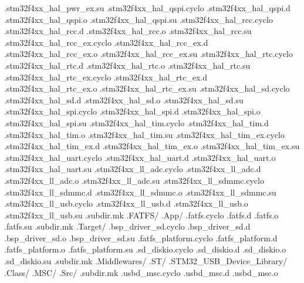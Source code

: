 \documentclass{article}
\begin{document}
{            .stm32f4xx_hal_pwr_ex.su
            .stm32f4xx_hal_qspi.cyclo
            .stm32f4xx_hal_qspi.d
            .stm32f4xx_hal_qspi.o
            .stm32f4xx_hal_qspi.su
            .stm32f4xx_hal_rcc.cyclo
            .stm32f4xx_hal_rcc.d
            .stm32f4xx_hal_rcc.o
            .stm32f4xx_hal_rcc.su
            .stm32f4xx_hal_rcc_ex.cyclo
            .stm32f4xx_hal_rcc_ex.d
            .stm32f4xx_hal_rcc_ex.o
            .stm32f4xx_hal_rcc_ex.su
            .stm32f4xx_hal_rtc.cyclo
            .stm32f4xx_hal_rtc.d
            .stm32f4xx_hal_rtc.o
            .stm32f4xx_hal_rtc.su
            .stm32f4xx_hal_rtc_ex.cyclo
            .stm32f4xx_hal_rtc_ex.d
            .stm32f4xx_hal_rtc_ex.o
            .stm32f4xx_hal_rtc_ex.su
            .stm32f4xx_hal_sd.cyclo
            .stm32f4xx_hal_sd.d
            .stm32f4xx_hal_sd.o
            .stm32f4xx_hal_sd.su
            .stm32f4xx_hal_spi.cyclo
            .stm32f4xx_hal_spi.d
            .stm32f4xx_hal_spi.o
            .stm32f4xx_hal_spi.su
            .stm32f4xx_hal_tim.cyclo
            .stm32f4xx_hal_tim.d
            .stm32f4xx_hal_tim.o
            .stm32f4xx_hal_tim.su
            .stm32f4xx_hal_tim_ex.cyclo
            .stm32f4xx_hal_tim_ex.d
            .stm32f4xx_hal_tim_ex.o
            .stm32f4xx_hal_tim_ex.su
            .stm32f4xx_hal_uart.cyclo
            .stm32f4xx_hal_uart.d
            .stm32f4xx_hal_uart.o
            .stm32f4xx_hal_uart.su
            .stm32f4xx_ll_adc.cyclo
            .stm32f4xx_ll_adc.d
            .stm32f4xx_ll_adc.o
            .stm32f4xx_ll_adc.su
            .stm32f4xx_ll_sdmmc.cyclo
            .stm32f4xx_ll_sdmmc.d
            .stm32f4xx_ll_sdmmc.o
            .stm32f4xx_ll_sdmmc.su
            .stm32f4xx_ll_usb.cyclo
            .stm32f4xx_ll_usb.d
            .stm32f4xx_ll_usb.o
            .stm32f4xx_ll_usb.su
            .subdir.mk
      .FATFS/
        .App/
          .fatfs.cyclo
          .fatfs.d
          .fatfs.o
          .fatfs.su
          .subdir.mk
        .Target/
          .bsp_driver_sd.cyclo
          .bsp_driver_sd.d
          .bsp_driver_sd.o
          .bsp_driver_sd.su
          .fatfs_platform.cyclo
          .fatfs_platform.d
          .fatfs_platform.o
          .fatfs_platform.su
          .sd_diskio.cyclo
          .sd_diskio.d
          .sd_diskio.o
          .sd_diskio.su
          .subdir.mk
      .Middlewares/
        .ST/
          .STM32_USB_Device_Library/
            .Class/
              .MSC/
                .Src/
                  .subdir.mk
                  .usbd_msc.cyclo
                  .usbd_msc.d
                  .usbd_msc.o
}
\end{document}
